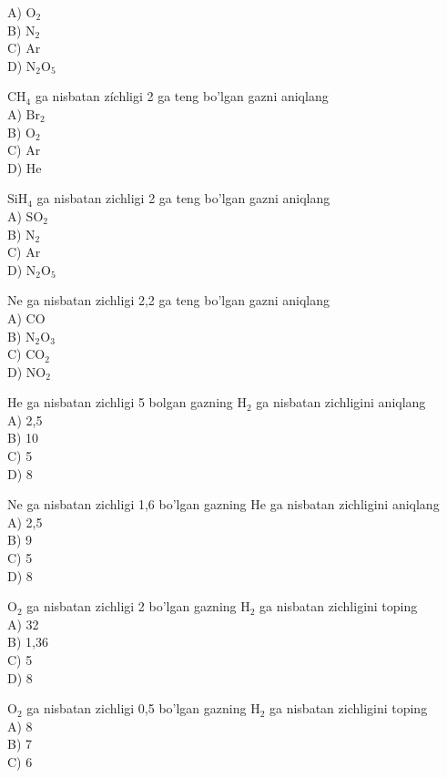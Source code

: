 A) $\mathrm{O}_{2}$\\
B) $\mathrm{N}_{2}$\\
C) Ar\\
D) $\mathrm{N}_{2} \mathrm{O}_{5}$
  \item $\mathrm{CH}_{4}$ ga nisbatan zíchligi 2 ga teng bo'lgan gazni aniqlang\\
A) $\mathrm{Br}_{2}$\\
B) $\mathrm{O}_{2}$\\
C) Ar\\
D) He
  \item $\mathrm{SiH}_{4}$ ga nisbatan zichligi 2 ga teng bo'lgan gazni aniqlang\\
A) $\mathrm{SO}_{2}$\\
B) $\mathrm{N}_{2}$\\
C) Ar\\
D) $\mathrm{N}_{2} \mathrm{O}_{5}$
  \item Ne ga nisbatan zichligi 2,2 ga teng bo'lgan gazni aniqlang\\
A) CO\\
B) $\mathrm{N}_{2} \mathrm{O}_{3}$\\
C) $\mathrm{CO}_{2}$\\
D) $\mathrm{NO}_{2}$
  \item He ga nisbatan zichligi 5 bolgan gazning $\mathrm{H}_{2}$ ga nisbatan zichligini aniqlang\\
A) 2,5\\
B) 10\\
C) 5\\
D) 8\\
  \item Ne ga nisbatan zichligi 1,6 bo'lgan gazning He ga nisbatan zichligini aniqlang\\
A) 2,5\\
B) 9\\
C) 5\\
D) 8
  \item $\mathrm{O}_{2}$ ga nisbatan zichligi 2 bo'lgan gazning $\mathrm{H}_{2}$ ga nisbatan zichligini toping\\
A) 32\\
B) 1,36\\
C) 5\\
D) 8
  \item $\mathrm{O}_{2}$ ga nisbatan zichligi 0,5 bo'lgan gazning $\mathrm{H}_{2}$ ga nisbatan zichligini toping\\
A) 8\\
B) 7\\
C) 6\\
